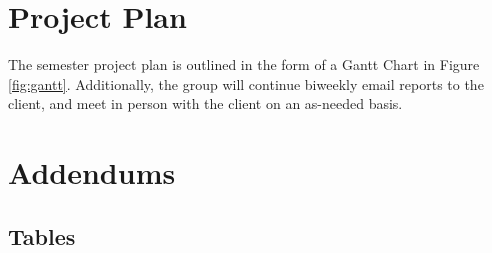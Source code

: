 \documentclass{article}
\begin{document}
\section{ Project Plan}
The semester project plan is outlined in the form of a Gantt Chart in Figure \ref{fig:gantt}. Additionally, the group will continue biweekly email reports to the client, and meet in person with the client on an as-needed basis. 

\section{Addendums}
\label{sec:addendums}

\subsection{Tables}
\label{sec:tables}
\end{document}
